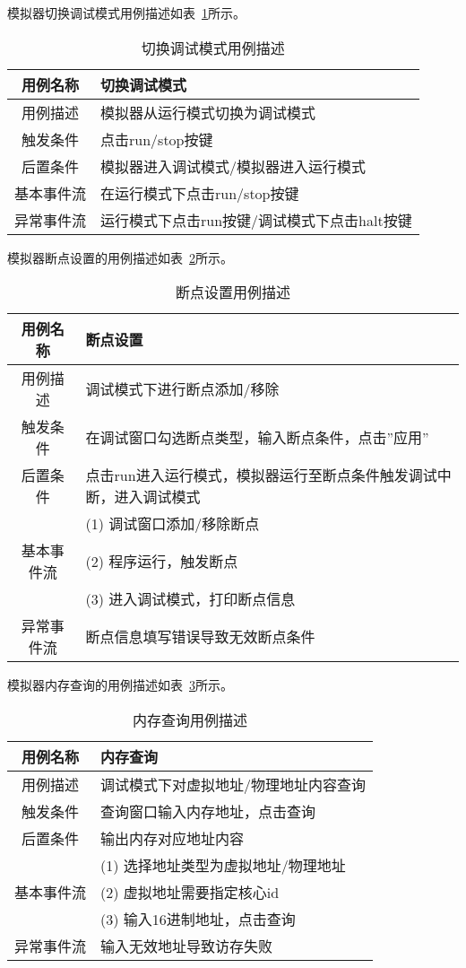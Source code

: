 模拟器切换调试模式用例描述如表~\ref{tab:yongli2}所示。
\begin{table}[h]
  \centering
  \caption{切换调试模式用例描述}
  \label{tab:yongli2}
  \begin{tabular}{cl}
    \toprule
用例名称	& 切换调试模式\\
    \midrule
用例描述	& 模拟器从运行模式切换为调试模式\\ \hline
触发条件	& 点击run/stop按键\\ \hline
后置条件	& 模拟器进入调试模式/模拟器进入运行模式\\ \hline
基本事件流	& 在运行模式下点击run/stop按键\\ \hline
异常事件流	& 运行模式下点击run按键/调试模式下点击halt按键\\
    \bottomrule
  \end{tabular}
\end{table}


模拟器断点设置的用例描述如表~\ref{tab:yongli3}所示。
\begin{table}[h]
  \centering
  \caption{断点设置用例描述}
  \label{tab:yongli3}
  \begin{tabular}{cl}
    \toprule
用例名称	& 断点设置\\
    \midrule
用例描述	& \multicolumn{1}{p{9cm}}{调试模式下进行断点添加/移除}\\ \hline
触发条件	& \multicolumn{1}{m{9cm}}{在调试窗口勾选断点类型，输入断点条件，点击”应用”}\\ \hline
后置条件	& \multicolumn{1}{m{9cm}}{点击run进入运行模式，模拟器运行至断点条件触发调试中断，进入调试模式}\\ \hline
 & \multicolumn{1}{m{9cm}}{(1)	调试窗口添加/移除断点}\\
 基本事件流 & \multicolumn{1}{m{9cm}}{(2)	程序运行，触发断点}\\
 & \multicolumn{1}{m{9cm}}{(3)	进入调试模式，打印断点信息}\\ \hline
异常事件流	& \multicolumn{1}{m{9cm}}{断点信息填写错误导致无效断点条件}\\
    \bottomrule
  \end{tabular}
\end{table}


模拟器内存查询的用例描述如表~\ref{tab:yongli4}所示。
\begin{table}[h]
  \centering
  \caption{内存查询用例描述}
  \label{tab:yongli4}
  \begin{tabular}{cl}
    \toprule
用例名称	& 内存查询\\
    \midrule
用例描述	& 调试模式下对虚拟地址/物理地址内容查询\\ \hline
触发条件	& 查询窗口输入内存地址，点击查询\\ \hline
后置条件	& 输出内存对应地址内容\\ \hline
	& (1) 选择地址类型为虚拟地址/物理地址\\
  基本事件流 &            (2) 虚拟地址需要指定核心id\\
 &            (3) 输入16进制地址，点击查询\\ \hline
异常事件流	& 输入无效地址导致访存失败\\
    \bottomrule
  \end{tabular}
\end{table}


